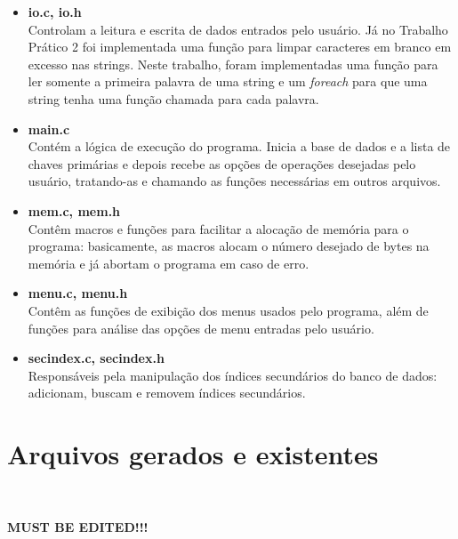 \documentclass{article}
\begin{document}
\begin{itemize}
 \item \textbf{io.c, io.h}\\
	Controlam a leitura e escrita de dados entrados pelo usuário. Já no Trabalho Prático 2 foi implementada uma função para limpar caracteres em branco em excesso nas strings. Neste trabalho, foram implementadas uma função para ler somente a primeira palavra de uma string e um \textit{foreach} para que uma string tenha uma função chamada para cada palavra.

 \item \textbf{main.c}\\
	Contém a lógica de execução do programa. Inicia a base de dados e a lista de chaves primárias e depois recebe as opções de operações desejadas pelo usuário, tratando-as e chamando as funções necessárias em outros arquivos.

 \item \textbf{mem.c, mem.h}\\
	Contêm macros e funções para facilitar a alocação de memória para o programa: basicamente, as macros alocam o número desejado de bytes na memória e já abortam o programa em caso de erro.
	
 \item \textbf{menu.c, menu.h}\\
	Contêm as funções de exibição dos menus usados pelo programa, além de funções para análise das opções de menu entradas pelo usuário.

 \item \textbf{secindex.c, secindex.h}\\
	Responsáveis pela manipulação dos índices secundários do banco de dados: adicionam, buscam e removem índices secundários.
\end{itemize}

\section{Arquivos gerados e existentes}\

\textbf{MUST BE EDITED!!!}
\end{document}
